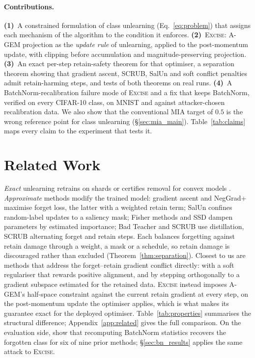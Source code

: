\documentclass{article}
\newcommand{\ours}{\textsc{Excise}}
\newcommand{\added}[1]{{\color{revised}#1}}
\newcommand{\rev}[1]{{\color{revisedB}#1}}
\theoremstyle{remark}
\theoremstyle{plain}
\begin{document}
\paragraph{Contributions.}
\textbf{(1)}~A constrained formulation of class unlearning
(Eq.~\ref{eq:problem}) \rev{that assigns each mechanism of the algorithm to the
condition it enforces}.
\textbf{(2)}~\ours{}: A-GEM projection as the \emph{update rule} of unlearning,
applied to the post-momentum update, with clipping before accumulation and
magnitude-preserving projection. \textbf{(3)}~An exact per-step retain-safety
theorem for that optimiser, a separation theorem showing that gradient ascent,
SCRUB, SalUn and soft conflict penalties admit retain-harming steps, and
\rev{tests of both theorems on real runs}. \textbf{(4)}~\rev{A
BatchNorm-recalibration failure mode of \ours{} and a fix that keeps BatchNorm,
verified on every CIFAR-10 class, on MNIST and against attacker-chosen
recalibration data.} We also show that the conventional MIA target of $0.5$ is
the wrong reference point for class unlearning (\rev{\S\ref{sec:mia_main}}).
\rev{Table~\ref{tab:claims} maps every claim to the experiment that tests it.}

\section{Related Work}\label{sec:related}

\emph{Exact} unlearning retrains on shards \citep{bourtoule2021sisa} or certifies
removal for convex models \citep{guo2020certified}. \emph{Approximate} methods
modify the trained model: gradient ascent and NegGrad+ \citep{thudi2022unrolling}
maximise forget loss, the latter with a weighted retain term; SalUn
\citep{fan2024salun} confines random-label updates to a saliency mask; Fisher
methods and SSD \citep{golatkar2020eternal,foster2024ssd} dampen parameters by
estimated importance; Bad Teacher \citep{chundawat2023badteacher} and SCRUB
\citep{kurmanji2023unbounded} use distillation, SCRUB alternating forget and
retain steps. Each balances forgetting against retain damage through a weight, a
mask or a schedule, so retain damage is discouraged rather than excluded
(Theorem~\ref{thm:separation}). Closest to us are methods that address the
forget--retain gradient conflict directly: \citet{patel2025learning} with a soft
regulariser that rewards positive alignment, and \added{\citet{hoang2024learn}
by stepping orthogonally to a gradient subspace estimated for the retained
data}. \ours{} instead imposes A-GEM's half-space constraint
\citep{chaudhry2019agem} against the current retain gradient at every step, on
the post-momentum update the optimiser applies, which is what makes its guarantee
exact for the deployed optimiser. Table~\ref{tab:properties} summarises the structural
difference; Appendix~\ref{app:related} gives the full comparison. \rev{On the
evaluation side, \citet{kalani2026batchnorm} show that recomputing BatchNorm
statistics recovers the forgotten class for six of nine prior methods;
\S\ref{sec:bn_results} applies the same attack to \ours{}.}
\end{document}

